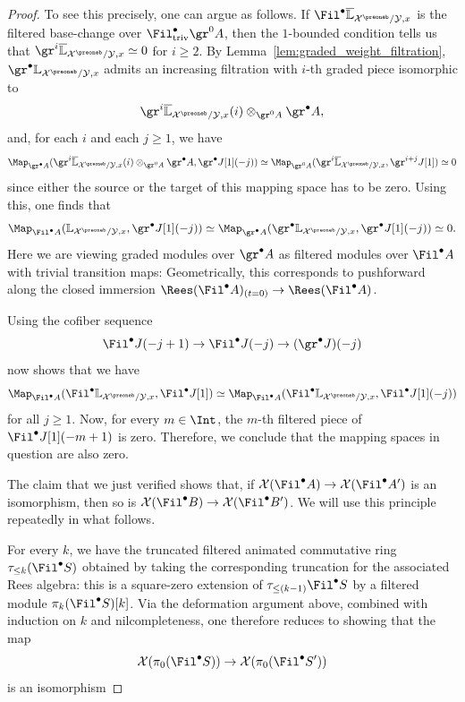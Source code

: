 \documentclass[10pt]{amsart}
\begin{document}
\begin{proof}
To see this precisely, one can argue as follows. If $\Fil^\bullet \overline{\mathbb{L}}_{\mathcal{X}^\preoneb/\mathcal{Y},x}$ is the filtered base-change over $\Fil^\bullet_{\mathrm{triv}}\gr^0A$, then the $1$-bounded condition tells us that $\gr^i\overline{\mathbb{L}}_{\mathcal{X}^\preoneb/\mathcal{Y},x}\simeq 0$ for $i\ge 2$. By Lemma~\ref{lem:graded_weight_filtration}, $\gr^\bullet \mathbb{L}_{\mathcal{X}^\preoneb/\mathcal{Y},x}$ admits an increasing filtration with $i$-th graded piece isomorphic to
\[
\gr^i\overline{\mathbb{L}}_{\mathcal{X}^\preoneb/ \mathcal{Y},x}(i)\otimes_{\gr^0A}\gr^\bullet A,
\]
and, for each $i$ and each $j\ge 1$, we have
\[
\Map_{\gr^\bullet A}(\gr^i\overline{\mathbb{L}}_{\mathcal{X}^\preoneb/ \mathcal{Y},x}(i)\otimes_{\gr^0A}\gr^\bullet A,\gr^\bullet J[1](-j))\simeq \Map_{\gr^0A}(\gr^i\overline{\mathbb{L}}_{\mathcal{X}^\preoneb/ \mathcal{Y},x},\gr^{i+j}J[1])\simeq 0
\]
since either the source or the target of this mapping space has to be zero. Using this, one finds that 
\[
\Map_{\Fil^\bullet A}(\mathbb{L}_{\mathcal{X}^\preoneb/\mathcal{Y},x},\gr^\bullet J[1](-j))\simeq \Map_{\gr^\bullet A}(\gr^\bullet\mathbb{L}_{\mathcal{X}^\preoneb/\mathcal{Y},x},\gr^\bullet J[1](-j))\simeq 0.
\]
Here we are viewing graded modules over $\gr^\bullet A$ as filtered modules over $\Fil^\bullet A$ with trivial transition maps: Geometrically, this corresponds to pushforward along the closed immersion $\Rees(\Fil^\bullet A)_{(t=0)}\to \Rees(\Fil^\bullet A)$.

Using the cofiber sequence
\[
\Fil^\bullet J(-j+1)\to \Fil^\bullet J(-j)\to (\gr^\bullet J)(-j)
\]
now shows that we have
\[
\Map_{\Fil^\bullet A}(\Fil^\bullet \mathbb{L}_{\mathcal{X}^\preoneb/\mathcal{Y},x},\Fil^\bullet J[1])\simeq \Map_{\Fil^\bullet A}(\Fil^\bullet \mathbb{L}_{\mathcal{X}^\preoneb/\mathcal{Y},x},\Fil^\bullet J[1](-j))
\]
for all $j\ge 1$. Now, for every $m\in\Int$, the $m$-th filtered piece of $\Fil^\bullet J[1](-m+1)$ is zero. Therefore, we conclude that the mapping spaces in question are also zero.


The claim that we just verified shows that, if $\mathcal{X}(\Fil^\bullet A)\to \mathcal{X}(\Fil^\bullet A')$ is an isomorphism, then so is $\mathcal{X}(\Fil^\bullet B)\to \mathcal{X}(\Fil^\bullet B')$. We will use this principle repeatedly in what follows.

For every $k$, we have the truncated filtered animated commutative ring $\tau_{\leq k}(\Fil^\bullet S)$ obtained by taking the corresponding truncation for the associated Rees algebra: this is a square-zero extension of $\tau_{\leq(k-1)}\Fil^\bullet S$ by a filtered module $\pi_k(\Fil^\bullet S)[k]$. Via the deformation argument above, combined with induction on $k$ and nilcompleteness, one therefore reduces to showing that the map
\[
\mathcal{X}(\pi_0(\Fil^\bullet S))\to \mathcal{X}(\pi_0(\Fil^\bullet S'))
\]
is an isomorphism


\end{proof}
\end{document}
